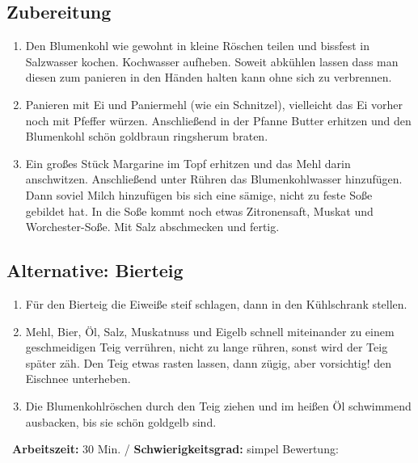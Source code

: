 \begin{minipage}[t]{0.58\textwidth}
\vspace{0pt}
\subsection*{Zubereitung}
\begin{enumerate}[leftmargin=*, itemindent=14pt]
\item Den Blumenkohl wie gewohnt in kleine Röschen teilen und bissfest in Salzwasser kochen. Kochwasser aufheben. Soweit abkühlen lassen dass man diesen zum panieren in den Händen halten kann ohne sich zu verbrennen. 

\item Panieren mit Ei und Paniermehl (wie ein Schnitzel), vielleicht das Ei vorher noch mit Pfeffer würzen. Anschließend in der Pfanne Butter erhitzen und den Blumenkohl schön goldbraun ringsherum braten.

\item Ein großes Stück Margarine im Topf erhitzen und das Mehl darin anschwitzen. Anschließend unter Rühren das Blumenkohlwasser hinzufügen. Dann soviel Milch hinzufügen bis sich eine sämige, nicht zu feste Soße gebildet hat. In die Soße kommt noch etwas Zitronensaft, Muskat und Worchester-Soße. Mit Salz abschmecken und fertig. 
\end{enumerate}

\subsection*{Alternative: Bierteig}
\begin{enumerate}[leftmargin=*, itemindent=14pt]
\item Für den Bierteig die Eiweiße steif schlagen, dann in den Kühlschrank stellen.

\item Mehl, Bier, Öl, Salz, Muskatnuss und Eigelb schnell miteinander zu einem geschmeidigen Teig verrühren, nicht zu lange rühren, sonst wird der Teig später zäh. Den Teig etwas rasten lassen, dann zügig, aber vorsichtig! den Eischnee unterheben.

\item Die Blumenkohlröschen durch den Teig ziehen und im heißen Öl schwimmend ausbacken, bis sie schön goldgelb sind.
\end{enumerate}
\end{minipage}
\vfill
\decothreeright \, \textbf{Arbeitszeit:} 30 Min. / \textbf{Schwierigkeitsgrad:} simpel \decothreeleft \hfill Bewertung:  \CIRCLE \CIRCLE \CIRCLE \CIRCLE  \Circle